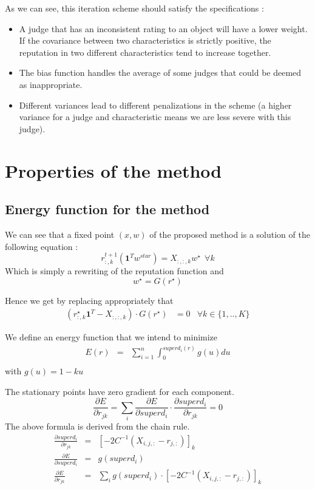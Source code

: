\documentclass[12pt,a4paper,notitlepage]{article}
\begin{document}
As we can see, this iteration scheme should satisfy the specifications : 
\begin{itemize}
\item A judge that has an inconsistent rating to an object will have a lower weight. If the covariance between two characteristics is strictly positive, the reputation in two different characteristics tend to increase together.
\item The bias function handles the average of some judges that could be deemed as inappropriate.
\item Different variances lead to different penalizations in the scheme (a higher variance for a judge and characteristic means we are less severe with this judge).
\end{itemize}

\section{Properties of the method}
\subsection{Energy function for the method}
We can see that a fixed point $(x,w)$ of the proposed method is a solution of the following equation :
$$ r_{:,k}^{t+1} (\mathbf{1}^Tw^{star}) = X_{:,:,k}w^{\star} \:\: \forall k$$
Which is simply a rewriting of the reputation function and 
$$ w^{\star} = G(r^{\star})$$

Hence we get by replacing appropriately that
\begin{align*}
(r_{:,k}^{\star} \mathbf{1}^T - X_{:,:,k})\cdot G(r^{\star}) &= 0 & \forall k\in \{1,..,K\}
\end{align*}

We define an energy function that we intend to minimize
\begin{eqnarray*}
E(r) & = & \sum_{i=1}^n \int_0^{superd_i(r)}g(u) du\\
\end{eqnarray*}
with $g(u) = 1 -ku$

The stationary points have zero gradient for each component.
$$
\frac{\partial E}{\partial r_{jk}} =  \sum_{i}\frac{\partial E}{\partial superd_i} \cdot \frac{\partial superd_i}{\partial r_{jk}} = 0
$$
The above formula is derived from the chain rule. 
\begin{eqnarray*}
\frac{\partial superd_i}{\partial r_{jk}} & = & \left[-2 C^{-1}(X_{i,j,:}-r_{j,:})\right]_{k} \\
\frac{\partial E}{\partial superd_i} & = & g(superd_i)\\
\frac{\partial E}{\partial r_{jk}} & = & \sum_{i}g(superd_i) \cdot \left[-2 C^{-1}(X_{i,j,:}-r_{j,:})\right]_{k} 
\end{eqnarray*}
\end{document}

